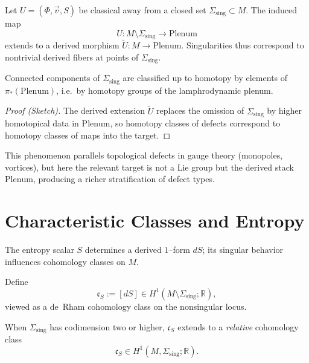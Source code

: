 Let $U=(\Phi,\vec v,S)$ be classical away from a closed set
$\Sigma_{\mathrm{sing}}\subset M$.
The induced map
\[
U\colon M\setminus\Sigma_{\mathrm{sing}}\longrightarrow \mathrm{Plenum}
\]
extends to a derived morphism
$\widetilde U\colon M\to\mathrm{Plenum}$.
Singularities thus correspond to nontrivial derived fibers at points of
$\Sigma_{\mathrm{sing}}$.

\begin{proposition}
\label{prop:classification}
Connected components of $\Sigma_{\mathrm{sing}}$ are classified up to
homotopy by elements of $\pi_{*}(\mathrm{Plenum})$, i.e.\ by homotopy
groups of the lamphrodynamic plenum.
\end{proposition}

\begin{proof}[Proof (Sketch)]
The derived extension $\widetilde U$ replaces the omission of
$\Sigma_{\mathrm{sing}}$ by higher homotopical data in
$\mathrm{Plenum}$, so homotopy classes of defects correspond to
homotopy classes of maps into the target.
\end{proof}

\begin{remark}
This phenomenon parallels topological defects in gauge theory (monopoles,
vortices), but here the relevant target is not a Lie group but the
derived stack $\mathrm{Plenum}$, producing a richer stratification of
defect types.
\end{remark}



\section{Characteristic Classes and Entropy}
\label{sec:char-classes}

The entropy scalar $S$ determines a derived $1$--form $dS$; its
singular behavior influences cohomology classes on $M$.

\begin{definition}
Define
\[
\mathfrak{c}_{S}:=[dS]\in H^{1}(M\setminus\Sigma_{\mathrm{sing}};\mathbb{R}),
\]
viewed as a de~Rham cohomology class on the nonsingular locus.
\end{definition}

When $\Sigma_{\mathrm{sing}}$ has codimension two or higher, $\mathfrak c_{S}$
extends to a \emph{relative} cohomology class
\[
\mathfrak{c}_{S}\in H^{1}(M,\Sigma_{\mathrm{sing}};\mathbb{R}).
\]

